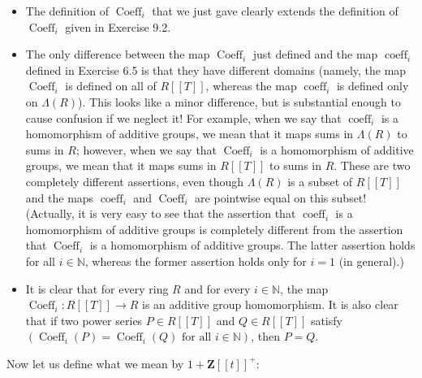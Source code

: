 \documentclass[numbers=enddot,12pt,final,onecolumn,notitlepage]{scrartcl}%
\begin{document}
\begin{itemize}
\item The definition of $\operatorname*{Coeff}\nolimits_{i}$ that we just gave
clearly extends the definition of $\operatorname*{Coeff}\nolimits_{i}$ given
in Exercise 9.2.

\item The only difference between the map $\operatorname*{Coeff}\nolimits_{i}$
just defined and the map $\operatorname*{coeff}\nolimits_{i}$ defined in
Exercise 6.5 is that they have different domains (namely, the map
$\operatorname*{Coeff}\nolimits_{i}$ is defined on all of $R\left[  \left[
T\right]  \right]  $, whereas the map $\operatorname*{coeff}\nolimits_{i}$ is
defined only on $\Lambda\left(  R\right)  $). This looks like a minor
difference, but is substantial enough to cause confusion if we neglect it! For
example, when we say that $\operatorname*{coeff}\nolimits_{i}$ is a
homomorphism of additive groups, we mean that it maps sums in $\Lambda\left(
R\right)  $ to sums in $R$; however, when we say that $\operatorname*{Coeff}%
\nolimits_{i}$ is a homomorphism of additive groups, we mean that it maps sums
in $R\left[  \left[  T\right]  \right]  $ to sums in $R$. These are two
completely different assertions, even though $\Lambda\left(  R\right)  $ is a
subset of $R\left[  \left[  T\right]  \right]  $ and the maps
$\operatorname*{coeff}\nolimits_{i}$ and $\operatorname*{Coeff}\nolimits_{i}$
are pointwise equal on this subset! (Actually, it is very easy to see that the
assertion that $\operatorname*{coeff}\nolimits_{i}$ is a homomorphism of
additive groups is completely different from the assertion that
$\operatorname*{Coeff}\nolimits_{i}$ is a homomorphism of additive groups. The
latter assertion holds for all $i\in\mathbb{N}$, whereas the former assertion
holds only for $i=1$ (in general).)

\item It is clear that for every ring $R$ and for every $i\in\mathbb{N}$, the
map $\operatorname*{Coeff}\nolimits_{i}:R\left[  \left[  T\right]  \right]
\rightarrow R$ is an additive group homomorphism. It is also clear that if two
power series $P\in R\left[  \left[  T\right]  \right]  $ and $Q\in R\left[
\left[  T\right]  \right]  $ satisfy $\left(  \operatorname*{Coeff}%
\nolimits_{i}\left(  P\right)  =\operatorname*{Coeff}\nolimits_{i}\left(
Q\right)  \text{ for all }i\in\mathbb{N}\right)  $, then $P=Q$.
\end{itemize}

Now let us define what we mean by $1+\mathbf{Z}\left[  \left[  t\right]
\right]  ^{+}$:
\end{document}
